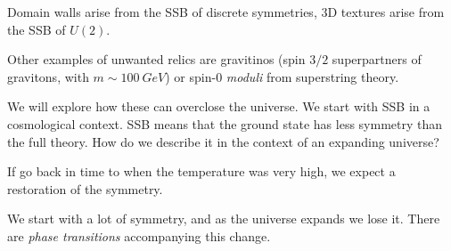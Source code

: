 \documentclass[main.tex]{subfiles}
\begin{document}
Domain walls arise from the SSB of discrete symmetries, 3D textures arise from the SSB of \(U(2)\).

Other examples of unwanted relics are gravitinos (spin \(3/2\) superpartners of gravitons, with \(m \sim \SI{100}{GeV}\)) or spin-0 \emph{moduli} from superstring theory. 

We will explore how these can overclose the universe.  
We start with SSB in a cosmological context. 
SSB means that the ground state has less symmetry than the full theory.
How do we describe it in the context of an expanding universe?

If go back in time to when the temperature was very high, we expect a restoration of the symmetry. 

We start with a lot of symmetry, and as the universe expands we lose it. There are \emph{phase transitions} accompanying this change. 
\end{document}

